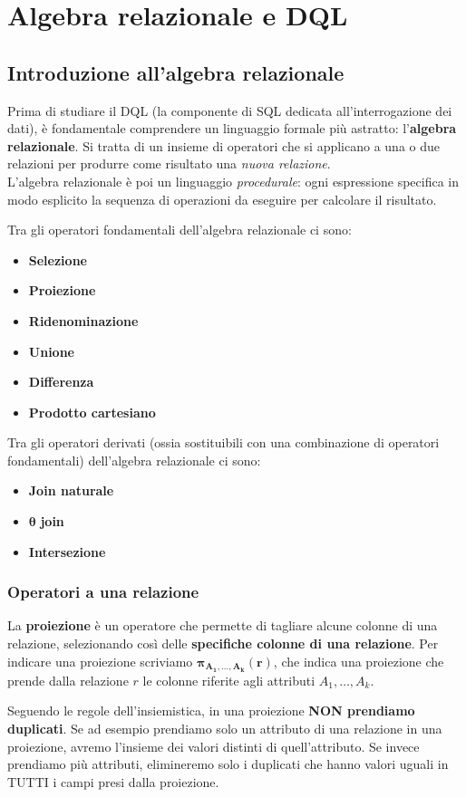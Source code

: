 \documentclass[11pt, a4paper, titlepage, oneside]{scrbook}
\begin{document}
\section{Algebra relazionale e DQL}

\subsection{Introduzione all'algebra relazionale}

Prima di studiare il DQL (la componente di SQL dedicata all'interrogazione dei dati), è fondamentale comprendere un linguaggio formale più astratto: l'\textbf{algebra relazionale}. Si tratta di un insieme di operatori che si applicano a una o due relazioni per produrre come risultato una \textit{nuova relazione}. \\
L'algebra relazionale è poi un linguaggio \textit{procedurale}: ogni espressione specifica in modo esplicito la sequenza di operazioni da eseguire per calcolare il risultato.

Tra gli operatori fondamentali dell'algebra relazionale ci sono:
\begin{itemize}
    \item \textbf{Selezione}
    \item \textbf{Proiezione}
    \item \textbf{Ridenominazione}
    \item \textbf{Unione}
    \item \textbf{Differenza}
    \item \textbf{Prodotto cartesiano}
\end{itemize}

Tra gli operatori derivati (ossia sostituibili con una combinazione di operatori fondamentali) dell'algebra relazionale ci sono:
\begin{itemize}
    \item \textbf{Join naturale}
    \item $\bm{\theta}$ \textbf{join}
    \item \textbf{Intersezione}
\end{itemize}

\subsubsection*{Operatori a una relazione}

\begin{Definizione}[Proiezione]
\label{def-proiezione}
La \textbf{proiezione} è un operatore che permette di tagliare alcune colonne di una relazione, selezionando così delle \textbf{specifiche colonne di una relazione}. Per indicare una proiezione scriviamo $\bm{\pi_{A_1, \ldots, A_k}(r)}$, che indica una proiezione che prende dalla relazione $r$ le colonne riferite agli attributi $A_1, \ldots, A_k$.
\end{Definizione}
Seguendo le regole dell'insiemistica, in una proiezione \textbf{NON prendiamo duplicati}. Se ad esempio prendiamo solo un attributo di una relazione in una proiezione, avremo l'insieme dei valori distinti di quell'attributo. Se invece prendiamo più attributi, elimineremo solo i duplicati che hanno valori uguali in TUTTI i campi presi dalla proiezione.
\end{document}
